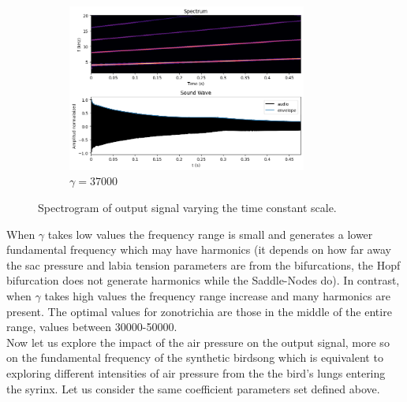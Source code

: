 \begin{figure}[H]
     \begin{subfigure}[b]{0.48\textwidth}
         \centering
         \includegraphics[width=\textwidth, height=5.5cm]{Images/gamma37000.png}
         \caption{$\gamma=37000$ }
         \label{fig:gamma37000}
     \end{subfigure}
        \caption{Spectrogram of output signal varying the time constant scale.}
        \label{fig:gamma_varying}
\end{figure}

When $\gamma$ takes low values the frequency range is small and generates a lower fundamental frequency which may have harmonics (it depends on how far away the sac pressure and labia tension parameters are from the bifurcations, the Hopf bifurcation does not generate harmonics while the Saddle-Nodes do). In contrast, when $\gamma$ takes high values the frequency range increase and many harmonics are present. The optimal values for zonotrichia are those in the middle of the entire range, values between 30000-50000.\\

Now let us explore the impact of the air pressure on the output signal, more so on the fundamental frequency of the synthetic birdsong which is equivalent to exploring different intensities of air pressure from the the bird's lungs entering the syrinx. Let us consider the same coefficient parameters set defined above.

